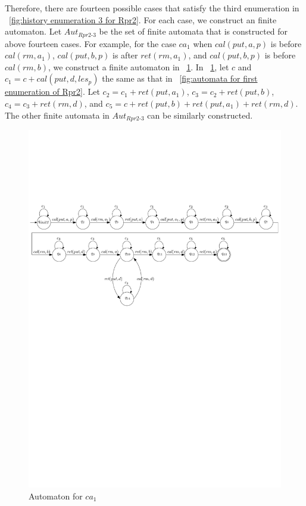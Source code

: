 \documentclass{llncs}
\begin{document}
Therefore, there are fourteen possible cases that satisfy the third enumeration in \figurename~\ref{fig:history enumeration 3 for Rpr2}. For each case, we construct an finite automaton. Let $\textit{Aut}_{\textit{Rpr2-3}}$ be the set of finite automata that is constructed for above fourteen cases. For example, for the case $\textit{ca}_1$ when $\textit{cal}(\textit{put},a,p)$ is before $\textit{cal}(\textit{rm},a_1)$, $\textit{cal}(\textit{put},b,p)$ is after $\textit{ret}(\textit{rm},a_1)$, and $\textit{cal}(\textit{put},b,p)$ is before $\textit{cal}(\textit{rm},b)$, we construct a finite automaton in \figurename~\ref{fig:automata for ca1 of third enumeration of Rpr2}. In \figurename~\ref{fig:automata for ca1 of third enumeration of Rpr2}, let $c$ and $c_1 = c + \textit{cal}(\textit{put},d,\textit{les}_p)$ the same as that in \figurename~\ref{fig:automata for first enumeration of Rpr2}. Let $c_2 = c_1 + \textit{ret}(\textit{put},a_1)$, $c_3 = c_2 + \textit{ret}(\textit{put},b)$, $c_4 = c_3 + \textit{ret}(\textit{rm},d)$, and $c_5 = c + \textit{ret}(\textit{put},b) + \textit{ret}(\textit{put},a_1) + \textit{ret}(\textit{rm},d)$. The other finite automata in $\textit{Aut}_{\textit{Rpr2-3}}$ can be similarly constructed.

\begin{figure}[htbp]
  \centering
  \includegraphics[width=0.8 \textwidth]{PIC_AUTO_Rpr2_3.pdf}
  \caption{Automaton for $\textit{ca}_1$}
  \label{fig:automata for ca1 of third enumeration of Rpr2}
\end{figure}
\end{document}
